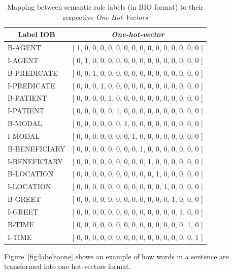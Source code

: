 \begin{table}
	\centering
	\caption{Mapping between semantic role labels (in BIO format) to their respective \textit{One-Hot-Vectors}}
	\label{table:onehotlabel}
	\begin{tabular}{|l|l|}
		\hline
		\multicolumn{1}{|c|}{Label IOB} & \multicolumn{1}{c|}{\textit{One-hot-vector}} \\ \hline
		B-AGENT 				& {[} 1, 0, 0, 0, 0, 0, 0, 0, 0, 0, 0, 0, 0, 0, 0, 0 {]} \\ \hline
		I-AGENT					& {[} 0, 1, 0, 0, 0, 0, 0, 0, 0, 0, 0, 0, 0, 0, 0, 0 {]} \\ \hline
		B-PREDICATE 		& {[} 0, 0, 1, 0, 0, 0, 0, 0, 0, 0, 0, 0, 0, 0, 0, 0 {]} \\ \hline
		I-PREDICATE 		& {[} 0, 0, 0, 1, 0, 0, 0, 0, 0, 0, 0, 0, 0, 0, 0, 0 {]} \\ \hline
		B-PATIENT 			& {[} 0, 0, 0, 0, 1, 0, 0, 0, 0, 0, 0, 0, 0, 0, 0, 0 {]} \\ \hline
		I-PATIENT			 & {[} 0, 0, 0, 0, 0, 1, 0, 0, 0, 0, 0, 0, 0, 0, 0, 0 {]} \\ \hline
		B-MODAL 			& {[} 0, 0, 0, 0, 0, 0, 1, 0, 0, 0, 0, 0, 0, 0, 0, 0 {]} \\ \hline
		I-MODAL 			& {[} 0, 0, 0, 0, 0, 0, 0, 1, 0, 0, 0, 0, 0, 0, 0, 0 {]} \\ \hline
		B-BENEFICIARY 	& {[} 0, 0, 0, 0, 0, 0, 0, 0, 1, 0, 0, 0, 0, 0, 0, 0 {]} \\ \hline
		I-BENEFICIARY 	& {[} 0, 0, 0, 0, 0, 0, 0, 0, 0, 1, 0, 0, 0, 0, 0, 0 {]} \\ \hline
		B-LOCATION 		& {[} 0, 0, 0, 0, 0, 0, 0, 0, 0, 0, 1, 0, 0, 0, 0, 0 {]} \\ \hline
		I-LOCATION		 & {[} 0, 0, 0, 0, 0, 0, 0, 0, 0, 0, 0, 1, 0, 0, 0, 0 {]} \\ \hline
		B-GREET 			& {[} 0, 0, 0, 0, 0, 0, 0, 0, 0, 0, 0, 0, 1, 0, 0, 0 {]} \\ \hline
		I-GREET 			& {[} 0, 0, 0, 0, 0, 0, 0, 0, 0, 0, 0, 0, 0, 1, 0, 0 {]} \\ \hline
		B-TIME 				& {[} 0, 0, 0, 0, 0, 0, 0, 0, 0, 0, 0, 0, 0, 0, 1, 0 {]} \\ \hline
		I-TIME 				& {[} 0, 0, 0, 0, 0, 0, 0, 0, 0, 0, 0, 0, 0, 0, 0, 1 {]} \\ \hline
	\end{tabular}
\end{table}

Figure~\ref{fig:labeltoone} shows an example of how words in a sentence are transformed into one-hot-vectors format.

